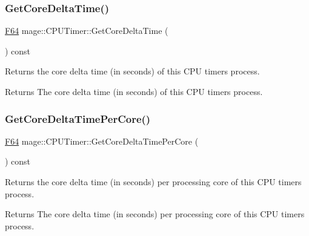 \subsubsection{\texorpdfstring{Get\+Core\+Delta\+Time()}{GetCoreDeltaTime()}}
{\footnotesize\ttfamily \hyperlink{namespacemage_ad26233bbec640deda836e572c1a23708}{F64} mage\+::\+C\+P\+U\+Timer\+::\+Get\+Core\+Delta\+Time (\begin{DoxyParamCaption}{ }\end{DoxyParamCaption}) const\hspace{0.3cm}{\ttfamily [noexcept]}}

Returns the core delta time (in seconds) of this C\+PU timer\textquotesingle{}s process.

\begin{DoxyReturn}{Returns}
The core delta time (in seconds) of this C\+PU timer\textquotesingle{}s process. 
\end{DoxyReturn}
\hypertarget{classmage_1_1_c_p_u_timer_a2b088ff4194fd2a5fd7201e8de4dd1da}{}\label{classmage_1_1_c_p_u_timer_a2b088ff4194fd2a5fd7201e8de4dd1da} 
\subsubsection{\texorpdfstring{Get\+Core\+Delta\+Time\+Per\+Core()}{GetCoreDeltaTimePerCore()}}
{\footnotesize\ttfamily \hyperlink{namespacemage_ad26233bbec640deda836e572c1a23708}{F64} mage\+::\+C\+P\+U\+Timer\+::\+Get\+Core\+Delta\+Time\+Per\+Core (\begin{DoxyParamCaption}{ }\end{DoxyParamCaption}) const\hspace{0.3cm}{\ttfamily [noexcept]}}

Returns the core delta time (in seconds) per processing core of this C\+PU timer\textquotesingle{}s process.

\begin{DoxyReturn}{Returns}
The core delta time (in seconds) per processing core of this C\+PU timer\textquotesingle{}s process. 
\end{DoxyReturn}
\hypertarget{classmage_1_1_c_p_u_timer_a806439a1ca61d81c877e9823b9cb0705}{}\label{classmage_1_1_c_p_u_timer_a806439a1ca61d81c877e9823b9cb0705} 
